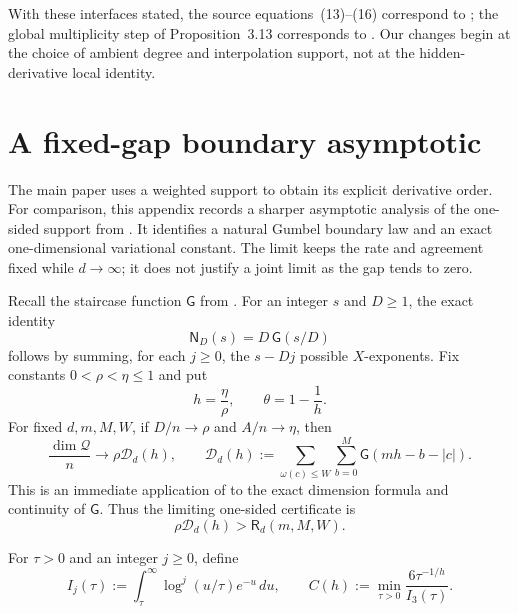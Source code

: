 \documentclass[11pt,letterpaper]{article}
\theoremstyle{definition}
\newcommand{\Qspace}{\mathcal{Q}}
\begin{document}
With these interfaces stated, the source equations~(13)--(16) correspond to
;
the global multiplicity step of Proposition~3.13 corresponds to
.  Our changes begin at the choice of
ambient degree and interpolation support, not at the hidden-derivative local
identity.
 \section{A fixed-gap boundary asymptotic}
\label{app:boundary-asymptotics}

The main paper uses a weighted support to obtain its explicit derivative
order. For comparison, this appendix records a sharper asymptotic analysis
of the one-sided support from . It identifies a
natural Gumbel boundary law and an exact one-dimensional variational
constant. The limit keeps the rate and agreement fixed while $d\to\infty$;
it does not justify a joint limit as the gap tends to zero.

Recall the staircase function \(\mathsf G\) from
.
For an integer $s$ and $D\ge1$, the exact identity
\begin{equation}
  \mathsf N_D(s)=D\,\mathsf G(s/D)
  \label{eq:boundary-staircase-exact}
\end{equation}
follows by summing, for each $j\ge0$, the $s-Dj$ possible
$X$-exponents. Fix constants $0<\rho <\eta\le1$ and put
\begin{equation}
  h=\frac{\eta}{\rho },
  \qquad
  \theta=1-\frac1h.
  \label{eq:boundary-h-theta}
\end{equation}
For fixed $d,m,M,W$, if $D/n\to \rho $ and $A/n\to\eta$, then
\begin{equation}
  \frac{\dim\Qspace}{n}
  \longrightarrow
  \rho \mathscr D_d(h),
  \qquad
  \mathscr D_d(h):=
  \sum_{\omega(c)\le W}\sum_{b=0}^{M}
  \mathsf G(mh-b-|c|).
  \label{eq:boundary-fixed-limit}
\end{equation}
This is an immediate application of
 to the exact dimension formula and
continuity of \(\mathsf G\). Thus the limiting one-sided certificate is
\begin{equation}
  \rho \mathscr D_d(h)>\mathsf R_d(m,M,W).
  \label{eq:boundary-limit-certificate}
\end{equation}

For $\tau>0$ and an integer $j\ge0$, define
\begin{equation}
  I_j(\tau):=
  \int_{\tau}^{\infty}\log^j(u/\tau)e^{-u}\,du,
  \qquad
  C(h):=\min_{\tau>0}\frac{6\tau^{-1/h}}{I_3(\tau)}.
  \label{eq:boundary-I-C}
\end{equation}
\end{document}
